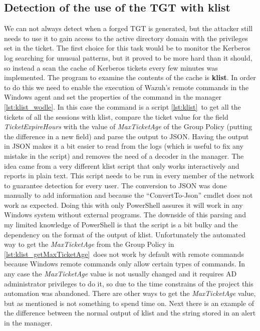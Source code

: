 \subsection{Detection of the use of the TGT with klist} \label{klist_detection}
We can not always detect when a forged TGT is generated, but the attacker still needs to use it to gain access to the active directory domain with the privileges set in the ticket. The first choice for this task would be to monitor the Kerberos log searching for unusual patterns, but it proved to be more hard than it should, so instead a scan the cache of Kerberos tickets every few minutes was implemented.
\linej
The program to examine the contents of the cache is \textbf{klist}.
\linej
\linej
In order to do this we need to enable the execution of Wazuh's remote commands in the Windows agent and set the properties of the command in the manager \ref{lst:klist_wodle}\cite{wazuh_remote_command}.
\linej
\linej
In this case the command is a script \ref{lst:klist}\ to get all the tickets of all the sessions with klist, compare the ticket value for the field \textit{TicketExpireHours} with the value of \textit{MaxTicketAge} of the Group Policy (putting the difference in a new field) and parse the output to JSON. Having the output in JSON makes it a bit easier to read from the logs (which is useful to fix any mistake in the script) and removes the need of a decoder in the manager.
The idea came from a very different klist script that only works interactively and reports in plain text\cite{klist_script_idea}.
\linej
This script needs to be run in every member of the network to guarantee detection for every user.
\linej
The conversion to JSON was done manually to add information and because the ``ConvertTo-Json'' cmdlet does not work as expected.
Doing this with only PowerShell assures it will work in any Windows system without external programs. The downside of this parsing and my limited knowledge of PowerShell is that the script is a bit bulky and the dependency on the format of the output of klist.
\linej
\linej
Unfortunately the automated way to get the \textit{MaxTicketAge} from the Group Policy in \ref{lst:klist_getMaxTicketAge}\ does not work by default with remote commands because Windows remote commands only allow certain types of commands.
In any case the \textit{MaxTicketAge} value is not usually changed and it requires AD administrator privileges to do it, so due to the time constrains of the project this automation was abandoned. There are other ways to get the \textit{MaxTicketAge} value, but as mentioned is not something to spend time on.
\linej
\linej
Next there is an example of the difference between the normal output of klist and the string stored in an alert in the manager.

